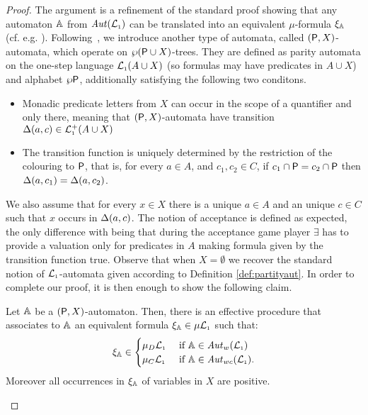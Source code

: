 \begin{proof}
The argument  is a refinement of the standard proof showing that any automaton 
$\mathbb{A}$ from $\mathit{Aut}(\mathcal{L}_{\scriptscriptstyle 1})$ can be translated into an equivalent $\mu$-formula 
$\xi_\mathbb{A}$ (cf. e.g. \cite[Section 6]{Ven08}). 
Following~\cite{Ven08}, we introduce another type of automata, called $(\mathsf{P},X)$-automata, which operate on $\wp{(\mathsf{P}\cup X)}$-trees.
They are defined as parity automata on the one-step language $\mathcal{L}_{\scriptscriptstyle 1}(A \cup X)$ (so formulas may have predicates in $A \cup X$) and alphabet $\wp{\mathsf{P}}$, additionally satisfying the following two conditons.
\begin{itemize}
\item Monadic predicate letters from $X$ can occur in the scope of a %
quantifier and only there, meaning that $(\mathsf{P},X)$-automata have transition 
$\Delta(a,c) \in \mathcal{L}_{\scriptscriptstyle 1}^+(A\cup X)$
%
\item 
The transition function is uniquely determined by the restriction of the 
colouring to $\mathsf{P}$, that is, for every $a \in A$, and $c_1, c_2 \in C$, if $c_1 \cap \mathsf{P} = c_2 \cap \mathsf{P}$ then $\Delta(a, c_1)= \Delta(a, c_2)$.
\end{itemize}
We also assume that
for every $x \in X$ there is a unique $a \in A$ and an unique $c \in C$ such that $x$ occurs in $\Delta(a,c)$.
The notion of acceptance is defined as expected, the only difference with being that during the acceptance game player $\exists$ has to provide a valuation only for predicates in $A$ making formula given by the transition function true. Observe that when $X = \emptyset$ we recover the standard notion of $\mathcal{L}_{\scriptscriptstyle 1}$-automata given according to Definition \ref{def:partityaut}. %
In order to complete our proof, it is then enough to show the following claim.
\begin{claimfirst}\label{c:1}
Let $\mathbb{A}$ be a $(\mathsf{P},X)$-automaton. Then, there is an effective procedure that associates to $\mathbb{A}$ an equivalent formula $\xi_\mathbb{A} \in \mu\mathcal{L}_{\scriptscriptstyle 1}$ such that:
\begin{equation}\label{eq:c1}
\xi_\aut \in 
\begin{cases}\mu_{D}\llang &\text{ if }\aut \in \AutW(\llang) \\
\mu_{C}\llang &\text{ if }\aut \in \AutWC(\llang) 
.
\end{cases}\end{equation}
Moreover all occurrences in $\xi_\mathbb{A}$ of variables in $X$ are positive.
\end{claimfirst}
\begin{pfclaim} %



\end{pfclaim}
\end{proof}
